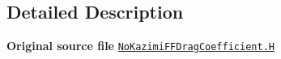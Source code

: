 \subsection{Detailed Description}
{\bfseries Original source file} \href{../../../home/carlo/data/GeN-Foam/GeN-Foam_ffn/GeN-Foam/GeN-Foam/classes/thermalHydraulics/src/physicsModels/dragModels/FFDragCoefficientModels/NoKazimi/NoKazimiFFDragCoefficient.H}{\tt No\+Kazimi\+F\+F\+Drag\+Coefficient.\+H} 